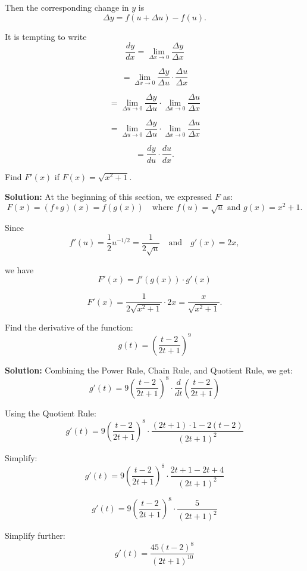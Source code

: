 \documentclass[12pt]{article}
\theoremstyle{beautifulthm}
\begin{document}
Then the corresponding change in \(y\) is
\[
\Delta y = f(u + \Delta u) - f(u).
\]

It is tempting to write
\[
\frac{dy}{dx} = \lim_{\Delta x \to 0} \frac{\Delta y}{\Delta x}
\]

\[
= \lim_{\Delta x \to 0} \frac{\Delta y}{\Delta u} \cdot \frac{\Delta u}{\Delta x}
\]

\[
= \lim_{\Delta u \to 0} \frac{\Delta y}{\Delta u} \cdot \lim_{\Delta x \to 0} \frac{\Delta u}{\Delta x}
\]

\[
= \lim_{\Delta u \to 0} \frac{\Delta y}{\Delta u} \cdot \lim_{\Delta x \to 0} \frac{\Delta u}{\Delta x}
\]

\[
= \frac{dy}{du} \cdot \frac{du}{dx}.
\]

\begin{tcolorbox}[colback=examplebg, colframe=red!75!black, title=\textbf{EXAMPLE : Find the Derivative of the function}, fonttitle=\bfseries, sharp corners]

Find \(F'(x)\) if \(F(x) = \sqrt{x^2 + 1}\).

\tcblower
\textbf{Solution:}
At the beginning of this section, we expressed \(F\) as:
\[
F(x) = (f \circ g)(x) = f(g(x)) \quad \text{where } f(u) = \sqrt{u} \text{ and } g(x) = x^2 + 1.
\]

Since
\[
f'(u) = \frac{1}{2} u^{-1/2} = \frac{1}{2\sqrt{u}} \quad \text{and} \quad g'(x) = 2x,
\]

we have
\[
F'(x) = f'(g(x)) \cdot g'(x)
\]

\[
F'(x) = \frac{1}{2\sqrt{x^2 + 1}} \cdot 2x = \frac{x}{\sqrt{x^2 + 1}}.
\]

\end{tcolorbox}

\begin{tcolorbox}[colback=examplebg, colframe=red!75!black, title=\textbf{EXAMPLE 2 : Find the Derivative of the function}, fonttitle=\bfseries, sharp corners]


Find the derivative of the function:
\[
g(t) = \left( \frac{t - 2}{2t + 1} \right)^9
\]

\tcblower
\textbf{Solution:}
Combining the Power Rule, Chain Rule, and Quotient Rule, we get:
\[
g'(t) = 9 \left( \frac{t - 2}{2t + 1} \right)^8 \cdot \frac{d}{dt} \left( \frac{t - 2}{2t + 1} \right)
\]

Using the Quotient Rule:
\[
g'(t) = 9 \left( \frac{t - 2}{2t + 1} \right)^8 \cdot \frac{(2t + 1) \cdot 1 - 2(t - 2)}{(2t + 1)^2}
\]

Simplify:
\[
g'(t) = 9 \left( \frac{t - 2}{2t + 1} \right)^8 \cdot \frac{2t + 1 - 2t + 4}{(2t + 1)^2}
\]

\[
g'(t) = 9 \left( \frac{t - 2}{2t + 1} \right)^8 \cdot \frac{5}{(2t + 1)^2}
\]

Simplify further:
\[
g'(t) = \frac{45(t - 2)^8}{(2t + 1)^{10}}
\]

\end{tcolorbox}
\end{document}
